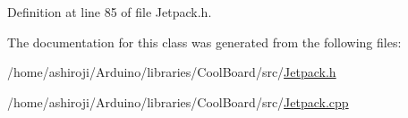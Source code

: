 Definition at line 85 of file Jetpack.\+h.



The documentation for this class was generated from the following files\+:\begin{DoxyCompactItemize}
\item 
/home/ashiroji/\+Arduino/libraries/\+Cool\+Board/src/\hyperlink{_jetpack_8h}{Jetpack.\+h}\item 
/home/ashiroji/\+Arduino/libraries/\+Cool\+Board/src/\hyperlink{_jetpack_8cpp}{Jetpack.\+cpp}\end{DoxyCompactItemize}
